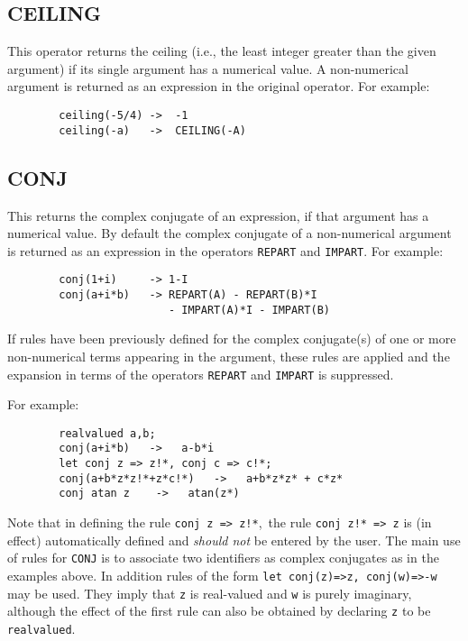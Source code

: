 \subsection{CEILING}
\hypertarget{operator:CEILING}{}
This operator returns the ceiling (i.e., the least integer greater than
the given argument) if its single argument has a numerical value.  A
non-numerical argument is returned as an expression in the original
operator.  For example:

\begin{verbatim}
        ceiling(-5/4) ->  -1
        ceiling(-a)   ->  CEILING(-A)
\end{verbatim}

\subsection{CONJ}
\hypertarget{operator:CONJ}{}
This returns the complex conjugate
of an expression, if that argument has a numerical value.  By default the
complex conjugate of a non-numerical argument is returned as an expression
in the operators
\texttt{REPART} and \texttt{IMPART}.
For example:
\begin{verbatim}
        conj(1+i)     -> 1-I
        conj(a+i*b)   -> REPART(A) - REPART(B)*I
                         - IMPART(A)*I - IMPART(B)
\end{verbatim}

If rules have been previously defined for the complex conjugate(s)
of one or more non-numerical terms appearing in the argument, these rules are
applied and the expansion in terms of the operators
\texttt{REPART} and \texttt{IMPART} is
suppressed.

For example:
\begin{verbatim}
        realvalued a,b;
        conj(a+i*b)   ->   a-b*i
        let conj z => z!*, conj c => c!*;
        conj(a+b*z*z!*+z*c!*)   ->   a+b*z*z* + c*z*
        conj atan z    ->   atan(z*)  
\end{verbatim}

Note that in defining the rule \texttt{conj z => z!*},\ the rule
\texttt{conj z!*  => z} is (in effect) automatically defined and 
\emph{should not} be entered by the user.
The main use of rules for \texttt{CONJ} is to associate two identifiers
as complex conjugates as in the examples above. In addition rules of the form
\texttt{let conj(z)=>z, conj(w)=>-w} may be used. They imply that
\texttt{z} is real-valued and \texttt{w} is purely imaginary, although
the effect of the first rule can also be obtained by declaring \texttt{z}
to be \texttt{realvalued}.

